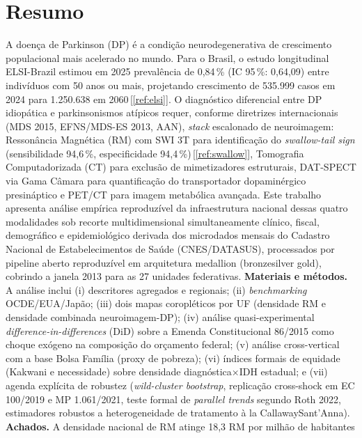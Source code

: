 \documentclass[12pt,a4paper,oneside]{article}
\begin{document}
\section*{Resumo}
\begin{singlespace}\small\noindent
A doença de Parkinson (DP) é a condição neurodegenerativa de
crescimento populacional mais acelerado no mundo. Para o Brasil, o
estudo longitudinal ELSI-Brazil estimou em 2025 prevalência de
0,84\,\% (IC 95\,\%: 0,64,09) entre indivíduos com 50
anos ou mais, projetando crescimento de 535.999 casos em 2024 para
1.250.638 em 2060\,[\ref{ref:elsi}]. O diagnóstico diferencial entre
DP idiopática e parkinsonismos atípicos requer, conforme diretrizes
internacionais (MDS 2015, EFNS/MDS-ES 2013, AAN), \textit{stack}
escalonado de neuroimagem: Ressonância Magnética (RM) com SWI 3T
para identificação do \textit{swallow-tail sign} (sensibilidade
94,6\,\%, especificidade 94,4\,\%)\,[\ref{ref:swallow}], Tomografia
Computadorizada (CT) para exclusão de mimetizadores estruturais,
DAT-SPECT via Gama Câmara para quantificação do transportador
dopaminérgico presináptico e PET/CT para imagem metabólica avançada.
Este trabalho apresenta análise empírica reproduzível da
infraestrutura nacional dessas quatro modalidades sob recorte
multidimensional \textemdash{} simultaneamente clínico, fiscal,
demográfico e epidemiológico \textemdash{} derivada dos microdados
mensais do Cadastro Nacional de Estabelecimentos de Saúde
(CNES/DATASUS), processados por pipeline aberto reproduzível em arquitetura medallion (bronze\textrightarrow silver
\textrightarrow gold), cobrindo a janela 2013 para
as 27 unidades federativas. \textbf{Materiais e métodos.} A análise
inclui (i) descritores agregados e regionais; (ii)
\textit{benchmarking} OCDE/EUA/Japão; (iii) dois mapas coropléticos
por UF (densidade RM e densidade combinada neuroimagem-DP); (iv)
análise quasi-experimental \textit{difference-in-differences} (DiD)
sobre a Emenda Constitucional 86/2015 como choque exógeno na
composição do orçamento federal; (v) análise cross-vertical com a
base Bolsa Família (proxy de pobreza); (vi) índices formais de
equidade (Kakwani e necessidade) sobre densidade
diagnóstica$\times$IDH estadual; e (vii) agenda explícita de
robustez (\textit{wild-cluster bootstrap}, replicação cross-shock
em EC 100/2019 e MP 1.061/2021, teste formal de \textit{parallel
trends} segundo Roth 2022, estimadores robustos a heterogeneidade
de tratamento à la Callaway\textendash Sant'Anna). \textbf{Achados.}
A densidade nacional de RM atinge 18,3 RM por milhão de habitantes

\end{singlespace}
\end{document}
